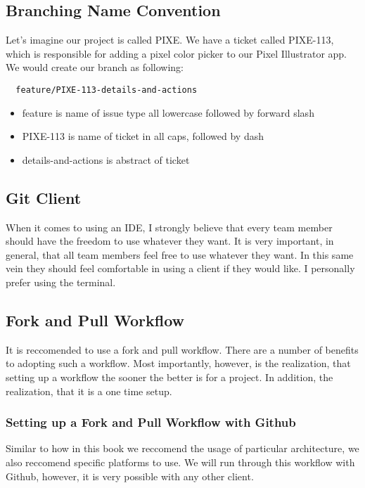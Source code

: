 \subsection { Branching Name Convention }
Let's imagine our project is called PIXE. We have a ticket called PIXE-113,
which is responsible for adding a pixel color picker to our Pixel Illustrator
app. We would create our branch as following:

\begin{verbatim}
  feature/PIXE-113-details-and-actions
\end{verbatim}

\begin{itemize}
  \item feature is name of issue type all lowercase followed by forward slash
  \item PIXE-113 is name of ticket in all caps, followed by dash
  \item details-and-actions is abstract of ticket
\end{itemize} 

\subsection { Git Client }
When it comes to using an IDE, I strongly believe that every team member should
have the freedom to use whatever they want. It is very important, in general,
that all team members feel free to use whatever they want. In this same vein
they should feel comfortable in using a client if they would like. I personally
prefer using the terminal.

\subsection { Fork and Pull Workflow }
It is reccomended to use a fork and pull workflow. There are a number of
benefits to adopting such a workflow. Most importantly, however, is the
realization, that setting up a workflow the sooner the better is for a project.
In addition, the realization, that it is a one time setup.

\subsubsection { Setting up a Fork and Pull Workflow with Github }
Similar to how in this book we reccomend the usage of particular architecture,
we also reccomend specific platforms to use. We will run through this workflow
with Github, however, it is very possible with any other client.

